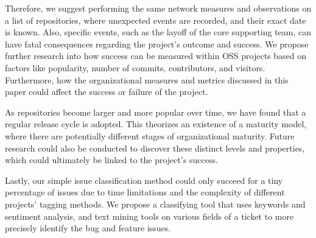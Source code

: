 Therefore, we suggest performing the same network measures and observations on a list of repositories, where unexpected events are recorded, and their exact date is known. Also, specific events, such as the layoff of the core supporting team, can have fatal consequences regarding the project's outcome and success. We propose further research into how success can be measured within OSS projects based on factors like popularity, number of commits, contributors, and visitors. Furthermore, how the organizational measures and metrics discussed in this paper could affect the success or failure of the project.

As repositories become larger and more popular over time, we have found that a regular release cycle is adopted. This theorizes an existence of a maturity model, where there are potentially different stages of organizational maturity. Future research could also be conducted to discover these distinct levels and properties, which could ultimately be linked to the project's success.

Lastly, our simple issue classification method could only succeed for a tiny percentage of issues due to time limitations and the complexity of different projects' tagging methods. We propose a classifying tool that uses keywords and sentiment analysis, and text mining tools on various fields of a ticket to more precisely identify the bug and feature issues.